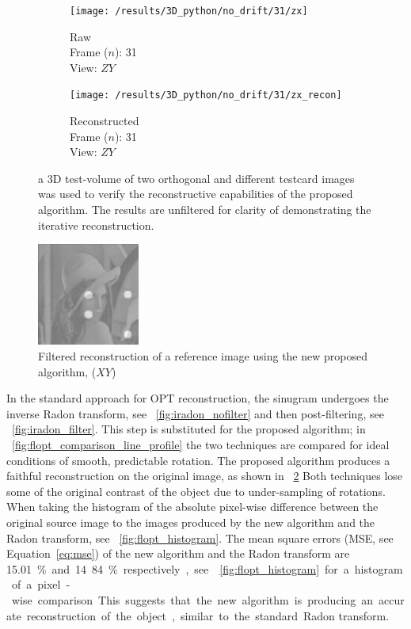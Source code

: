 \begin{figure}
    \begin{subfigure}[t]{0.2\linewidth}
        \centering
        \texttt{[image: /results/3D\_python/no\_drift/31/zx]}\caption{Raw\\Frame (\(n\)): 31\\View: \(ZY\)}
    \end{subfigure}\hfill
    \begin{subfigure}[t]{0.2\linewidth}
        \centering
        \texttt{[image: /results/3D\_python/no\_drift/31/zx\_recon]}\caption{Reconstructed\\Frame (\(n\)): 31\\View: \(ZY\)}
    \end{subfigure}
    \caption{a \gls{3D} test-volume of two orthogonal and different testcard images was used to verify the reconstructive capabilities of the proposed algorithm.
    The results are unfiltered for clarity of demonstrating the iterative reconstruction.}
    \label{fig:recon_iterative}
\end{figure}

\begin{figure}
  \centering
  \includegraphics[width=0.3\textwidth]{Chapters/flopt/Figs/PDF/results/no_helix/flopt_filter}
\caption{Filtered reconstruction of a reference image using the new proposed algorithm, (\(XY\))}
\label{fig:flopt_filter}
\end{figure}

In the standard approach for \gls{OPT} reconstruction, the \gls{sinugram} undergoes the inverse \gls{Radon transform}, see \figurename~\ref{fig:iradon_nofilter} and then post-filtering, see \figurename~\ref{fig:iradon_filter}.
This step is substituted for the proposed algorithm; in \figurename~\ref{fig:flopt_comparison_line_profile} the two techniques are compared for ideal conditions of smooth, predictable rotation.
The proposed algorithm produces %
a faithful reconstruction on the original image, as shown in \figurename~\ref{fig:flopt_filter} %
Both techniques lose some of the original contrast of the object due to under-sampling of rotations.
When taking the histogram of the absolute pixel-wise difference between the original source image to the images produced by the new algorithm and the \gls{Radon transform},
see \figurename~\ref{fig:flopt_histogram}.
The mean square errors (\gls{MSE}, see Equation~\eqref{eq:mse}) of the new algorithm and the \gls{Radon transform} are \SI{15.01}\% and 14.84\% respectively, see \figurename~\ref{fig:flopt_histogram} for a histogram of a pixel-wise comparison.
This suggests that the new algorithm is producing an accurate reconstruction of the object, similar to the standard \gls{Radon transform}.

